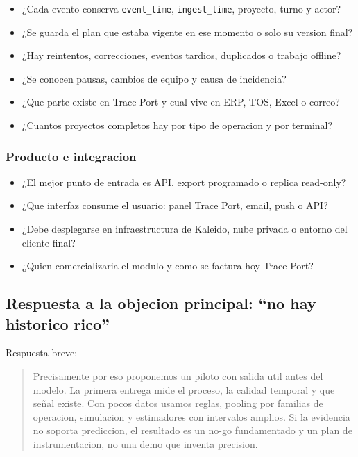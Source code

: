 \documentclass[
  spanish,
  10pt,
  a4paper,
]{article}
\providecommand{\tightlist}{%
  \setlength{\itemsep}{0pt}\setlength{\parskip}{0pt}}
\begin{document}
\begin{itemize}
\tightlist
\item
  ¿Cada evento conserva \texttt{event\_time}, \texttt{ingest\_time},
  proyecto, turno y actor?
\item
  ¿Se guarda el plan que estaba vigente en ese momento o solo su version
  final?
\item
  ¿Hay reintentos, correcciones, eventos tardios, duplicados o trabajo
  offline?
\item
  ¿Se conocen pausas, cambios de equipo y causa de incidencia?
\item
  ¿Que parte existe en Trace Port y cual vive en ERP, TOS, Excel o
  correo?
\item
  ¿Cuantos proyectos completos hay por tipo de operacion y por terminal?
\end{itemize}

\subsubsection{Producto e integracion}\label{producto-e-integracion}

\begin{itemize}
\tightlist
\item
  ¿El mejor punto de entrada es API, export programado o replica
  read-only?
\item
  ¿Que interfaz consume el usuario: panel Trace Port, email, push o API?
\item
  ¿Debe desplegarse en infraestructura de Kaleido, nube privada o
  entorno del cliente final?
\item
  ¿Quien comercializaria el modulo y como se factura hoy Trace Port?
\end{itemize}

\subsection{Respuesta a la objecion principal: ``no hay historico
rico''}\label{respuesta-a-la-objecion-principal-no-hay-historico-rico}

Respuesta breve:

\begin{quote}
Precisamente por eso proponemos un piloto con salida util antes del
modelo. La primera entrega mide el proceso, la calidad temporal y que
señal existe. Con pocos datos usamos reglas, pooling por familias de
operacion, simulacion y estimadores con intervalos amplios. Si la
evidencia no soporta prediccion, el resultado es un no-go fundamentado y
un plan de instrumentacion, no una demo que inventa precision.
\end{quote}
\end{document}
